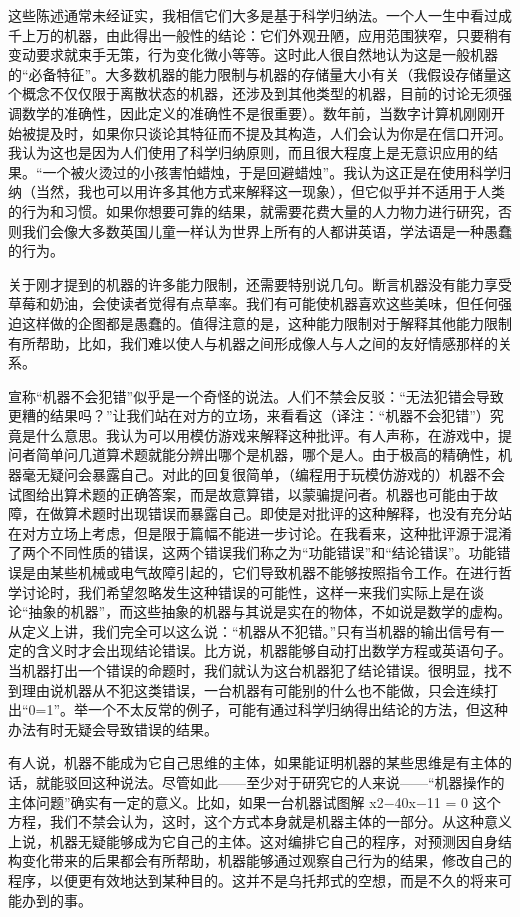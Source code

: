 \documentclass[12pt,a4paper,twoside]{article}
\begin{document}
这些陈述通常未经证实，我相信它们大多是基于科学归纳法。一个人一生中看过成千上万的机器，由此得出一般性的结论：它们外观丑陋，应用范围狭窄，只要稍有变动要求就束手无策，行为变化微小等等。这时此人很自然地认为这是一般机器的“必备特征”。大多数机器的能力限制与机器的存储量大小有关（我假设存储量这个概念不仅仅限于离散状态的机器，还涉及到其他类型的机器，目前的讨论无须强调数学的准确性，因此定义的准确性不是很重要）。数年前，当数字计算机刚刚开始被提及时，如果你只谈论其特征而不提及其构造，人们会认为你是在信口开河。我认为这也是因为人们使用了科学归纳原则，而且很大程度上是无意识应用的结果。“一个被火烫过的小孩害怕蜡烛，于是回避蜡烛”。我认为这正是在使用科学归纳（当然，我也可以用许多其他方式来解释这一现象），但它似乎并不适用于人类的行为和习惯。如果你想要可靠的结果，就需要花费大量的人力物力进行研究，否则我们会像大多数英国儿童一样认为世界上所有的人都讲英语，学法语是一种愚蠢的行为。

关于刚才提到的机器的许多能力限制，还需要特别说几句。断言机器没有能力享受草莓和奶油，会使读者觉得有点草率。我们有可能使机器喜欢这些美味，但任何强迫这样做的企图都是愚蠢的。值得注意的是，这种能力限制对于解释其他能力限制有所帮助，比如，我们难以使人与机器之间形成像人与人之间的友好情感那样的关系。

宣称“机器不会犯错”似乎是一个奇怪的说法。人们不禁会反驳：“无法犯错会导致更糟的结果吗？”让我们站在对方的立场，来看看这（译注：“机器不会犯错”）究竟是什么意思。我认为可以用模仿游戏来解释这种批评。有人声称，在游戏中，提问者简单问几道算术题就能分辨出哪个是机器，哪个是人。由于极高的精确性，机器毫无疑问会暴露自己。对此的回复很简单，（编程用于玩模仿游戏的）机器不会试图给出算术题的正确答案，而是故意算错，以蒙骗提问者。机器也可能由于故障，在做算术题时出现错误而暴露自己。即使是对批评的这种解释，也没有充分站在对方立场上考虑，但是限于篇幅不能进一步讨论。在我看来，这种批评源于混淆了两个不同性质的错误，这两个错误我们称之为“功能错误”和“结论错误”。功能错误是由某些机械或电气故障引起的，它们导致机器不能够按照指令工作。在进行哲学讨论时，我们希望忽略发生这种错误的可能性，这样一来我们实际上是在谈论“抽象的机器”，而这些抽象的机器与其说是实在的物体，不如说是数学的虚构。从定义上讲，我们完全可以这么说：“机器从不犯错。”只有当机器的输出信号有一定的含义时才会出现结论错误。比方说，机器能够自动打出数学方程或英语句子。当机器打出一个错误的命题时，我们就认为这台机器犯了结论错误。很明显，找不到理由说机器从不犯这类错误，一台机器有可能别的什么也不能做，只会连续打出“0=1”。举一个不太反常的例子，可能有通过科学归纳得出结论的方法，但这种办法有时无疑会导致错误的结果。

有人说，机器不能成为它自己思维的主体，如果能证明机器的某些思维是有主体的话，就能驳回这种说法。尽管如此——至少对于研究它的人来说——“机器操作的主体问题”确实有一定的意义。比如，如果一台机器试图解 x2−40x−11 = 0 这个方程，我们不禁会认为，这时，这个方式本身就是机器主体的一部分。从这种意义上说，机器无疑能够成为它自己的主体。这对编排它自己的程序，对预测因自身结构变化带来的后果都会有所帮助，机器能够通过观察自己行为的结果，修改自己的程序，以便更有效地达到某种目的。这并不是乌托邦式的空想，而是不久的将来可能办到的事。
\end{document}
